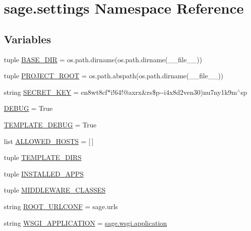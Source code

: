 \hypertarget{namespacesage_1_1settings}{}\section{sage.\+settings Namespace Reference}
\label{namespacesage_1_1settings}
\subsection*{Variables}
\begin{DoxyCompactItemize}
\item 
tuple \hyperlink{namespacesage_1_1settings_add6d83672b1137d74a06bf1606aecf04}{B\+A\+S\+E\+\_\+\+D\+I\+R} = os.\+path.\+dirname(os.\+path.\+dirname(\+\_\+\+\_\+file\+\_\+\+\_\+))
\item 
tuple \hyperlink{namespacesage_1_1settings_ae2e71004e0684c0243b4e9792726cd0f}{P\+R\+O\+J\+E\+C\+T\+\_\+\+R\+O\+O\+T} = os.\+path.\+abspath(os.\+path.\+dirname(\+\_\+\+\_\+file\+\_\+\+\_\+))
\item 
string \hyperlink{namespacesage_1_1settings_acc7cb44e3d92fc1334c19318ede49bc8}{S\+E\+C\+R\+E\+T\+\_\+\+K\+E\+Y} = \textquotesingle{}en8wt8cf$\ast$i!64!@axrx\&rs\$p-\/-\/i4x8d2ven30)nu7ny1k9m$^\wedge$sp\textquotesingle{}
\item 
\hyperlink{namespacesage_1_1settings_acc28086c56df6aed910b2552e07944cc}{D\+E\+B\+U\+G} = True
\item 
\hyperlink{namespacesage_1_1settings_a74c98bee40b9b06d51e44be6df73eb46}{T\+E\+M\+P\+L\+A\+T\+E\+\_\+\+D\+E\+B\+U\+G} = True
\item 
list \hyperlink{namespacesage_1_1settings_a2eb98def792cf73bbc5884024afc5602}{A\+L\+L\+O\+W\+E\+D\+\_\+\+H\+O\+S\+T\+S} = \mbox{[}$\,$\mbox{]}
\item 
tuple \hyperlink{namespacesage_1_1settings_addc90c15790d385d304972f1b3098a86}{T\+E\+M\+P\+L\+A\+T\+E\+\_\+\+D\+I\+R\+S}
\item 
tuple \hyperlink{namespacesage_1_1settings_af48e999a4a4e7f8830d84ac4eb08df1a}{I\+N\+S\+T\+A\+L\+L\+E\+D\+\_\+\+A\+P\+P\+S}
\item 
tuple \hyperlink{namespacesage_1_1settings_a247a0ea3c79f999897dbfaed3bc99b1d}{M\+I\+D\+D\+L\+E\+W\+A\+R\+E\+\_\+\+C\+L\+A\+S\+S\+E\+S}
\item 
string \hyperlink{namespacesage_1_1settings_a92b3d804acae3871a9877ad143df4201}{R\+O\+O\+T\+\_\+\+U\+R\+L\+C\+O\+N\+F} = \textquotesingle{}sage.\+urls\textquotesingle{}
\item 
string \hyperlink{namespacesage_1_1settings_a700b653427cc28bc1ebe951b419cfd58}{W\+S\+G\+I\+\_\+\+A\+P\+P\+L\+I\+C\+A\+T\+I\+O\+N} = \textquotesingle{}\hyperlink{namespacesage_1_1wsgi_a1ddb23bace7377dbda42c61a804bb9aa}{sage.\+wsgi.\+application}\textquotesingle{}

\end{DoxyCompactItemize}
